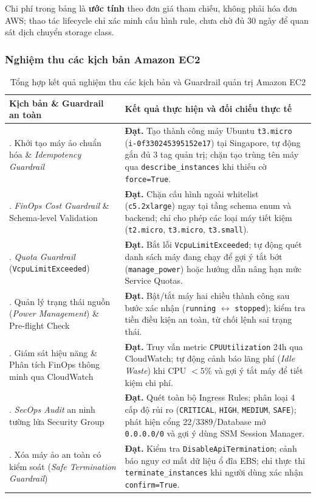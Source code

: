 \documentclass[a4paper,12pt]{article}
\newcommand{\code}[1]{\texttt{#1}}
\begin{document}
Chi phí trong bảng là \textbf{ước tính}
theo đơn giá tham chiếu, không phải hóa đơn AWS; thao tác lifecycle chỉ xác
minh cấu hình rule, chưa chờ đủ 30 ngày để quan sát dịch chuyển storage class.

\subsubsection{Nghiệm thu các kịch bản Amazon EC2}
\begingroup
\setlength{\tabcolsep}{6pt}
\renewcommand{\arraystretch}{1.15}
\fontsize{10.5}{14}\selectfont
\begin{longtable}{@{}>{\raggedright\arraybackslash}p{4.8cm}>{\raggedright\arraybackslash}p{\dimexpr\linewidth-4.8cm-2\tabcolsep\relax}@{}}
\caption{Tổng hợp kết quả nghiệm thu các kịch bản và Guardrail quản trị Amazon EC2}\label{tab:ec2_acceptance_summary}\\
\toprule
\textbf{Kịch bản \& Guardrail an toàn} & \textbf{Kết quả thực hiện và đối chiếu thực tế}\\
\midrule
\endfirsthead
\endhead
\endfoot
\bottomrule
\endlastfoot
1. Khởi tạo máy ảo chuẩn hóa \& \textit{Idempotency Guardrail} & \textbf{Đạt.} Tạo thành công máy Ubuntu \code{t3.micro} (\code{i-0f330245395152e17}) tại Singapore, tự động gắn đủ 3 tag quản trị; chặn tạo trùng tên máy qua \code{describe\_instances} khi thiếu cờ \code{force=True}.\\
2. \textit{FinOps Cost Guardrail} \& Schema-level Validation & \textbf{Đạt.} Chặn cấu hình ngoài whitelist (\code{c5.2xlarge}) ngay tại tầng schema enum và backend; chỉ cho phép các loại máy tiết kiệm (\code{t2.micro}, \code{t3.micro}, \code{t3.small}).\\
3. \textit{Quota Guardrail} (\code{VcpuLimitExceeded}) & \textbf{Đạt.} Bắt lỗi \code{VcpuLimitExceeded}; tự động quét danh sách máy đang chạy để gợi ý tắt bớt (\code{manage\_power}) hoặc hướng dẫn nâng hạn mức Service Quotas.\\
4. Quản lý trạng thái nguồn (\textit{Power Management}) \& Pre-flight Check & \textbf{Đạt.} Bật/tắt máy hai chiều thành công sau bước xác nhận (\code{running} $\leftrightarrow$ \code{stopped}); kiểm tra tiền điều kiện an toàn, từ chối lệnh sai trạng thái.\\
5. Giám sát hiệu năng \& Phân tích FinOps thông minh qua CloudWatch & \textbf{Đạt.} Truy vấn metric \code{CPUUtilization} 24h qua CloudWatch; tự động cảnh báo lãng phí (\textit{Idle Waste}) khi CPU $< 5\%$ và gợi ý tắt máy để tiết kiệm chi phí.\\
6. \textit{SecOps Audit} an ninh tường lửa Security Group & \textbf{Đạt.} Quét toàn bộ Ingress Rules; phân loại 4 cấp độ rủi ro (\code{CRITICAL}, \code{HIGH}, \code{MEDIUM}, \code{SAFE}); phát hiện cổng 22/3389/Database mở \code{0.0.0.0/0} và gợi ý dùng SSM Session Manager.\\
7. Xóa máy ảo an toàn có kiểm soát (\textit{Safe Termination Guardrail}) & \textbf{Đạt.} Kiểm tra \code{DisableApiTermination}; cảnh báo nguy cơ mất dữ liệu ổ đĩa EBS; chỉ thực thi \code{terminate\_instances} khi người dùng xác nhận \code{confirm=True}.\\
\end{longtable}
\endgroup
\end{document}
